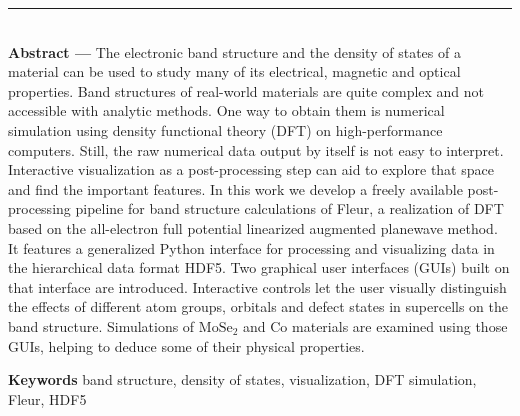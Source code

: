 \clearpage


\thispagestyle{empty}

\vspace*{\fill}
\noindent\rule[2pt]{\textwidth}{0.5pt}\\
{\textbf{Abstract ---}}
The electronic band structure and the density of states of a material can be used to study many of its electrical, magnetic and optical properties. Band structures of real-world materials are quite complex and not accessible with analytic methods. One way to obtain them is numerical simulation using density functional theory (DFT) on high-performance computers.
Still, the raw numerical data output by itself is not easy to interpret. Interactive visualization as a post-processing step can aid to explore that space and find the important features. In this work we develop a freely available post-processing pipeline for band structure calculations of Fleur, a realization of DFT based on the all-electron full potential linearized augmented planewave method. It features a generalized Python interface for processing and visualizing data in the hierarchical data format HDF5. Two graphical user interfaces (GUIs) built on that interface are introduced. Interactive controls let the user visually distinguish the effects of different atom groups, orbitals and defect states in supercells on the band structure. Simulations of $\textrm{MoSe}_2$ and $\textrm{Co}$ materials are examined using those GUIs, helping to deduce some of their physical properties.


{\textbf{Keywords}}
band structure, density of states, visualization, DFT simulation, Fleur, HDF5
\\

